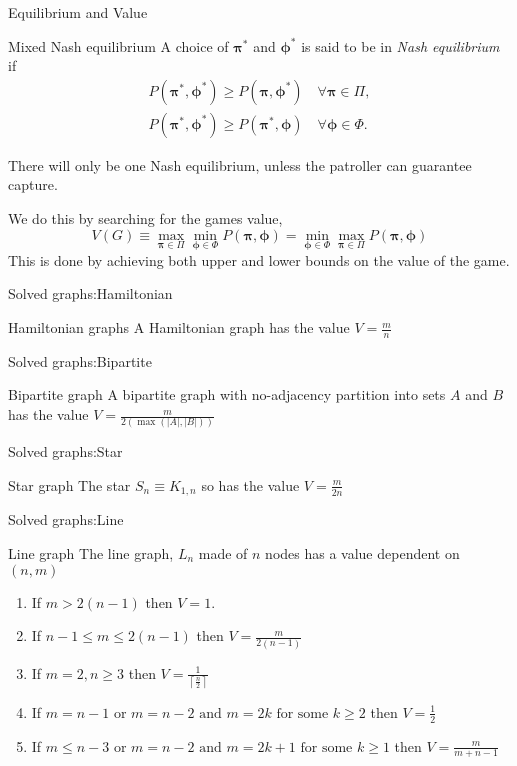 \documentclass[11pt]{beamer}
\newcommand{\ceil}[1]{\left \lceil #1 \right \rceil}
\begin{document}
\begin{frame}{Equilibrium and Value}
\begin{block}{Mixed Nash equilibrium}
A choice of $\bm{\pi}^*$ and $\bm{\phi}^*$ is said to be in \textit{Nash equilibrium} if 
\begin{align*}
P(\bm{\pi}^*,\bm{\phi}^*) \geq P(\bm{\pi},\bm{\phi}^*) \quad \forall \bm{\pi} \in \Pi , \\
P(\bm{\pi}^*,\bm{\phi}^*) \geq P(\bm{\pi}^*,\bm{\phi}) \quad \forall \bm{\phi} \in \Phi .
\end{align*}
\end{block}
There will only be one Nash equilibrium, unless the patroller can guarantee capture.

We do this by searching for the games value, $$V(G) \equiv \max\limits_{\bm{\pi} \in \Pi} \min\limits_{\bm{\phi} \in \Phi} P(\bm{\pi},\bm{\phi})=\min\limits_{\bm{\phi} \in \Phi} \max\limits_{\bm{\pi} \in \Pi} P(\bm{\pi},\bm{\phi})$$
This is done by achieving both upper and lower bounds on the value of the game.
\end{frame}

\begin{frame}{Solved graphs:Hamiltonian}

\begin{block}{Hamiltonian graphs}
A Hamiltonian graph has the value $V=\frac{m}{n}$
\end{block}

\end{frame}

\begin{frame}{Solved graphs:Bipartite}
\begin{block}{Bipartite graph}
A bipartite graph with no-adjacency partition into sets $A$ and $B$ has the value $V=\frac{m}{2(\max(|A|,|B|))}$
\end{block}
\end{frame}

\begin{frame}{Solved graphs:Star}
\begin{block}{Star graph}
The star $S_{n} \equiv K_{1,n}$ so has the value $V=\frac{m}{2n}$
\end{block}
\end{frame}

\begin{frame}{Solved graphs:Line}
\begin{block}{Line graph}
The line graph, $L_{n}$ made of $n$ nodes has a value dependent on $(n,m)$
\begin{enumerate}
\item If $m > 2(n-1)$ then $V=1$.
\item If $n-1 \leq m \leq 2(n-1)$ then $V=\frac{m}{2(n-1)}$
\item If $m=2 , n\geq 3$ then $V=\frac{1}{\ceil{\frac{n}{2}}}$
\item If $m=n-1 \text{ or } m=n-2  \text{ and } m=2k \text{ for some } k \geq 2 $ then $V=\frac{1}{2}$
\item If $m \leq n-3 \text{ or } m=n-2 \text{ and } m=2k+1 \text{ for some } k \geq 1$ then $V=\frac{m}{m+n-1}$
\end{enumerate}
\end{block}
\end{frame}
\end{document}
